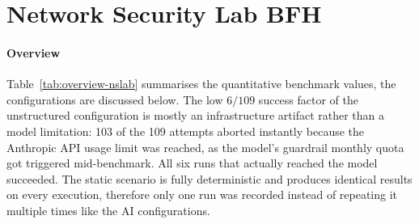 \section{Network Security Lab BFH}\label{sec:eval-cyberlab}

\paragraph{Overview}


\begin{table}[H]
    \caption{Benchmark Results --- Network Security Lab BFH}
    \centering
    \label{tab:overview-nslab}
\end{table}
\vspace{2pt}

Table~\ref{tab:overview-nslab} summarises the quantitative benchmark values,  the configurations are discussed below.
The low \(6/109\) success factor of the unstructured configuration is mostly an infrastructure artifact rather than a model limitation:
103 of the 109 attempts aborted instantly because the \gls{Anthropic} \gls{API} usage limit was reached, as the model's guardrail monthly quota got triggered mid-benchmark.
All six runs that actually reached the model succeeded.
The static scenario is fully deterministic and produces identical results on every execution, therefore only one run was recorded instead of repeating it multiple times like the \gls{AI} configurations.\\



